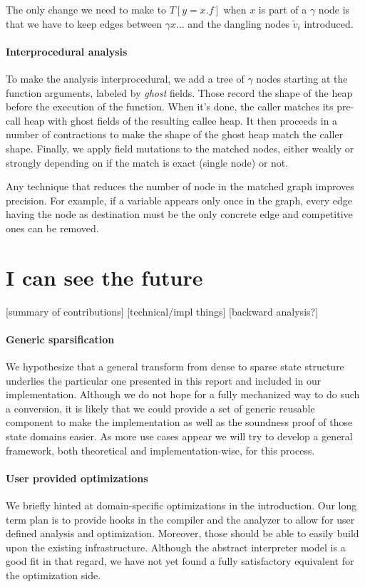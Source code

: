 \documentclass[11pt]{article}
\begin{document}
The only change we need to make to $T[y=x.f]$ when $x$ is part of a $\gamma$ node is that we have to keep edges between $\gamma x\dots$ and the dangling nodes $\tilde{v}_i$ introduced.


\paragraph{Interprocedural analysis}
To make the analysis interprocedural, we add a tree of $\gamma$ nodes starting at the function arguments, labeled by \emph{ghost} fields.
Those record the shape of the heap before the execution of the function.
When it's done, the caller matches its pre-call heap with ghost fields of the resulting callee heap.
It then proceeds in a number of contractions to make the shape of the ghost heap match the caller shape.
Finally, we apply field mutations to the matched nodes, either weakly or strongly depending on if the match is exact (single node) or not.

Any technique that reduces the number of node in the matched graph improves precision.
For example, if a variable appears only once in the graph, every edge having the node as destination must be the only concrete edge and competitive ones can be removed.


\section*{I can see the future}

[summary of contributions] [technical/impl things] [backward analysis?]

\paragraph{Generic sparsification} We hypothesize that a general transform from dense to sparse state structure underlies the particular one presented in this report and included in our implementation.
Although we do not hope for a fully mechanized way to do such a conversion, it is likely that we could provide a set of generic reusable component to make the implementation as well as the soundness proof of those state domains easier.
As more use cases appear we will try to develop a general framework, both theoretical and implementation-wise, for this process.

\paragraph{User provided optimizations} We briefly hinted at domain-specific optimizations in the introduction.
Our long term plan is to provide hooks in the compiler and the analyzer to allow for user defined analysis and optimization.
Moreover, those should be able to easily build upon the existing infrastructure.
Although the abstract interpreter model is a good fit in that regard, we have not yet found a fully satisfactory equivalent for the optimization side.
\end{document}

